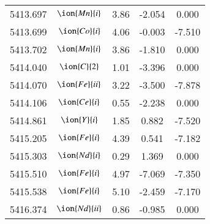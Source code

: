 \documentclass[fleqn,usenatbib]{mnras}
\begin{document}
\begin{center}
\begin{table}
\begin{tabular}{ccccc}
5413.697 &  $\ion{Mn}{i}$  & 3.86 & -2.054 & 0.000 \\ 
5413.699 &  $\ion{Co}{i}$  & 4.06 & -0.003 & -7.510 \\ 
5413.702 &  $\ion{Mn}{i}$  & 3.86 & -1.810 & 0.000 \\ 
5414.040 &  $\ion{C}{2}$ & 1.01 & -3.396 & 0.000 \\ 
5414.070 &  $\ion{Fe}{ii}$  & 3.22 & -3.500 & -7.878 \\ 
5414.106 &  $\ion{Ce}{i}$  & 0.55 & -2.238 & 0.000 \\ 
5414.861 &  $\ion{Y}{i}$  & 1.85 & 0.882 & -7.520 \\ 
5415.205 &  $\ion{Fe}{i}$  & 4.39 & 0.541 & -7.182 \\ 
5415.303 &  $\ion{Nd}{i}$  & 0.29 & 1.369 & 0.000 \\ 
5415.510 &  $\ion{Fe}{i}$  & 4.97 & -7.069 & -7.350 \\ 
5415.538 &  $\ion{Fe}{i}$  & 5.10 & -2.459 & -7.170 \\ 
5416.374 &  $\ion{Nd}{ii}$  & 0.86 & -0.985 & 0.000 \\ 
 \end{tabular}
 \end{table}
 \end{center}
 
\end{document}
